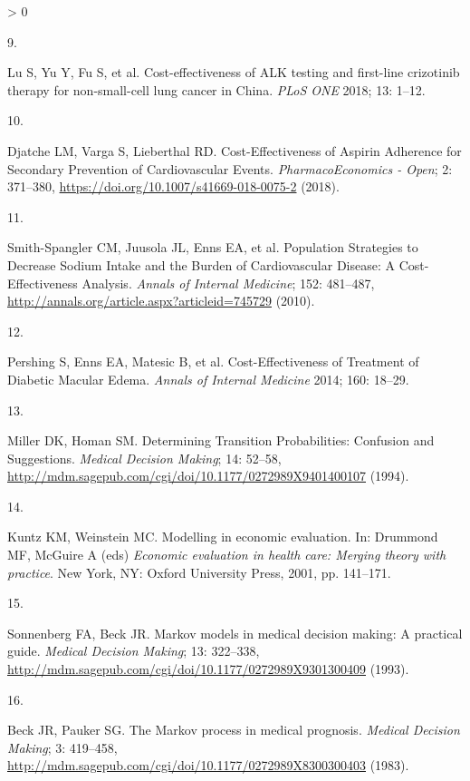 \documentclass[
]{article}
\newlength{\cslhangindent}
\newlength{\csllabelwidth}
\newenvironment{CSLReferences}[2] %
 {%
  \setlength{\parindent}{0pt}
  \ifodd #1 \everypar{\setlength{\hangindent}{\cslhangindent}}\ignorespaces\fi
  \ifnum #2 > 0
  \setlength{\parskip}{#2\baselineskip}
  \fi
 }%
 {}
\newcommand{\CSLLeftMargin}[1]{\parbox[t]{\csllabelwidth}{#1}}
\newcommand{\CSLRightInline}[1]{\parbox[t]{\linewidth - \csllabelwidth}{#1}\break}
\begin{document}
\begin{CSLReferences}{0}{0}
\leavevmode\hypertarget{ref-Lu2018b}{}%
\CSLLeftMargin{9. }
\CSLRightInline{Lu S, Yu Y, Fu S, et al. {Cost-effectiveness of ALK testing and first-line crizotinib therapy for non-small-cell lung cancer in China}. \emph{PLoS ONE} 2018; 13: 1--12.}

\leavevmode\hypertarget{ref-Djatche2018}{}%
\CSLLeftMargin{10. }
\CSLRightInline{Djatche LM, Varga S, Lieberthal RD. {Cost-Effectiveness of Aspirin Adherence for Secondary Prevention of Cardiovascular Events}. \emph{PharmacoEconomics - Open}; 2: 371--380, \url{https://doi.org/10.1007/s41669-018-0075-2} (2018).}

\leavevmode\hypertarget{ref-Smith-Spangler2010}{}%
\CSLLeftMargin{11. }
\CSLRightInline{Smith-Spangler CM, Juusola JL, Enns EA, et al. {Population Strategies to Decrease Sodium Intake and the Burden of Cardiovascular Disease: A Cost-Effectiveness Analysis}. \emph{Annals of Internal Medicine}; 152: 481--487, \url{http://annals.org/article.aspx?articleid=745729} (2010).}

\leavevmode\hypertarget{ref-Pershing2014}{}%
\CSLLeftMargin{12. }
\CSLRightInline{Pershing S, Enns EA, Matesic B, et al. {Cost-Effectiveness of Treatment of Diabetic Macular Edema}. \emph{Annals of Internal Medicine} 2014; 160: 18--29.}

\leavevmode\hypertarget{ref-Miller1994}{}%
\CSLLeftMargin{13. }
\CSLRightInline{Miller DK, Homan SM. {Determining Transition Probabilities: Confusion and Suggestions}. \emph{Medical Decision Making}; 14: 52--58, \url{http://mdm.sagepub.com/cgi/doi/10.1177/0272989X9401400107} (1994).}

\leavevmode\hypertarget{ref-Kuntz2001}{}%
\CSLLeftMargin{14. }
\CSLRightInline{Kuntz KM, Weinstein MC. {Modelling in economic evaluation}. In: Drummond MF, McGuire A (eds) \emph{Economic evaluation in health care: Merging theory with practice}. New York, NY: Oxford University Press, 2001, pp. 141--171.}

\leavevmode\hypertarget{ref-Sonnenberg1993}{}%
\CSLLeftMargin{15. }
\CSLRightInline{Sonnenberg FA, Beck JR. {Markov models in medical decision making: A practical guide}. \emph{Medical Decision Making}; 13: 322--338, \url{http://mdm.sagepub.com/cgi/doi/10.1177/0272989X9301300409} (1993).}

\leavevmode\hypertarget{ref-Beck1983}{}%
\CSLLeftMargin{16. }
\CSLRightInline{Beck JR, Pauker SG. {The Markov process in medical prognosis}. \emph{Medical Decision Making}; 3: 419--458, \url{http://mdm.sagepub.com/cgi/doi/10.1177/0272989X8300300403} (1983).}


\end{CSLReferences}
\end{document}
